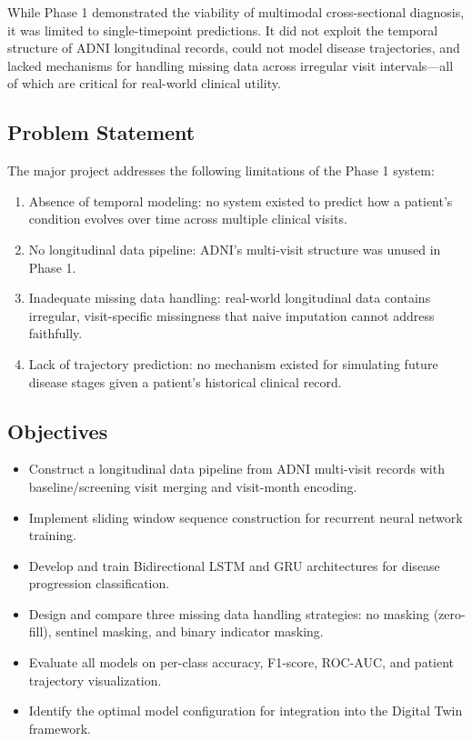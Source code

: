 \documentclass[12pt,singleside,a4paper]{article}
\begin{document}
While Phase 1 demonstrated the viability of multimodal cross-sectional diagnosis, it was limited to single-timepoint predictions. It did not exploit the temporal structure of ADNI longitudinal records, could not model disease trajectories, and lacked mechanisms for handling missing data across irregular visit intervals—all of which are critical for real-world clinical utility.

\subsection{Problem Statement}

The major project addresses the following limitations of the Phase 1 system:
\begin{enumerate}
    \item Absence of temporal modeling: no system existed to predict how a patient's condition evolves over time across multiple clinical visits.
    \item No longitudinal data pipeline: ADNI's multi-visit structure was unused in Phase 1.
    \item Inadequate missing data handling: real-world longitudinal data contains irregular, visit-specific missingness that naive imputation cannot address faithfully.
    \item Lack of trajectory prediction: no mechanism existed for simulating future disease stages given a patient's historical clinical record.
\end{enumerate}

\subsection{Objectives}

\begin{itemize}
    \item Construct a longitudinal data pipeline from ADNI multi-visit records with baseline/screening visit merging and visit-month encoding.
    \item Implement sliding window sequence construction for recurrent neural network training.
    \item Develop and train Bidirectional LSTM and GRU architectures for disease progression classification.
    \item Design and compare three missing data handling strategies: no masking (zero-fill), sentinel masking, and binary indicator masking.
    \item Evaluate all models on per-class accuracy, F1-score, ROC-AUC, and patient trajectory visualization.
    \item Identify the optimal model configuration for integration into the Digital Twin framework.
\end{itemize}
\end{document}
